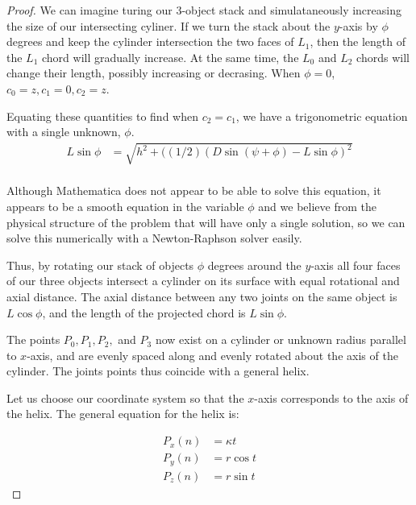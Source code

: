 \documentclass[11pt]{article}
\begin{document}
{\begin{proof}
  We can imagine turing our 3-object stack and simulataneously increasing the size of our intersecting
  cyliner. If we turn the stack about the $y$-axis by $\phi$ degrees and keep the cylinder intersection
  the two faces of $L_1$, then the length of the $L_1$ chord will gradually increase. At the same time,
  the $L_0$ and $L_2$ chords will change their length, possibly increasing or decrasing.
  When $\phi = 0$, $c_0 = z, c_1 = 0, c_2 = z$.

  Equating these quantities to find when $c_2 = c_1$, we have a trigonometric equation with
  a single unknown, $\phi$.
    \begin{align*}
      L \sin{\phi} &= \sqrt{h^2 + ((1/2)(D\sin{(\psi+\phi)}-L\sin{\phi})^2} \\
    \end{align*}

    Although Mathematica does not appear to be able to solve this equation, it appears
    to be a smooth equation in the variable $\phi$ and we believe from the physical
    structure of the problem that will have only a single solution, so we can
    solve this numerically with a Newton-Raphson solver easily.
    
    Thus, by rotating our stack of objects $\phi$ degrees around the $y$-axis 
    all four faces of our three objects intersect a cylinder on its surface with
    equal rotational and axial distance. The axial distance between any two joints
    on the same object is $L \cos{\phi}$,
    and the length of the projected chord is $L \sin{\phi}$.

    The points $P_0,P_1,P_2,$ and $P_3$ now exist on a cylinder or unknown radius parallel
    to $x$-axis, and are evenly spaced along and evenly rotated about the axis of the
    cylinder. The joints points thus coincide with a general helix.

    Let us choose our coordinate system so that the $x$-axis corresponds to the
    axis of the helix. The general equation for the helix is:

\begin{align*}
    P_x(n) &= \kappa  t  \\
    P_y(n) &= r \cos{t} \\
   P_z(n) &= r \sin{t}
\end{align*}


\end{proof}}
\end{document}
